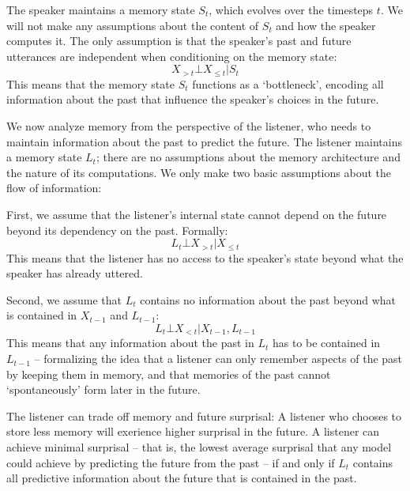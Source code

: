 \documentclass[11pt,letterpaper]{article}
\begin{document}
The speaker maintains a memory state $S_t$, which evolves over the timesteps $t$.
We will not make any assumptions about the content of $S_t$ and how the speaker computes it.
The only assumption is that the speaker's past and future utterances are independent when conditioning on the memory state:
\begin{equation}\label{eq:markov-speaker}
X_{>t} \bot X_{\leq t} | S_t
\end{equation}
This means that the memory state $S_t$ functions as a `bottleneck', encoding all information about the past that influence the speaker's choices in the future.


We now analyze memory from the perspective of the listener, who needs to maintain information about the past to predict the future.
The listener maintains a memory state $L_t$; there are no assumptions about the memory architecture and the nature of its computations.
We only make two basic assumptions about the flow of information:

First, we assume that the listener's internal state cannot depend on the future beyond its dependency on the past.
Formally: 
\begin{equation}\label{eq:listener-markov-1}
L_t \bot X_{>t} | X_{\leq t}
\end{equation}
This means that the listener has no access to the speaker's state beyond what the speaker has already uttered.

Second, we assume that $L_t$ contains no information about the past beyond what is contained in $X_{t-1}$ and $L_{t-1}$:
\begin{equation}\label{eq:listener-markov-2}
L_t \bot X_{<t} | X_{t-1}, L_{t-1}
\end{equation}
This means that any information about the past in $L_t$ has to be contained in $L_{t-1}$ -- formalizing the idea that a listener can only remember aspects of the past by keeping them in memory, and that memories of the past cannot `spontaneously' form later in the future.

The listener can trade off memory and future surprisal:
A listener who chooses to store less memory will exerience higher surprisal in the future.
A listener can achieve minimal surprisal -- that is, the lowest average surprisal that any model could achieve by predicting the future from the past -- if and only if $L_t$ contains all predictive information about the future that is contained in the past.
\end{document}
